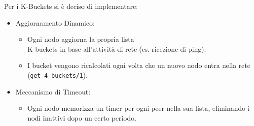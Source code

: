 \documentclass{article}
\begin{document}
Per i K-Buckets si è deciso di implementare:
\begin{itemize}
    \item Aggiornamento Dinamico:
    \begin{itemize}
        \item Ogni nodo aggiorna la propria lista\\ K-buckets in base all'attività di rete (es. ricezione di ping).
        \item I bucket vengono ricalcolati ogni volta che un nuovo nodo entra nella rete \\ (\texttt{get\_4\_buckets/1}).
    \end{itemize}
    \item Meccanismo di Timeout:
    \begin{itemize}
        \item Ogni nodo memorizza un timer per ogni peer nella sua lista, eliminando i nodi inattivi dopo un certo periodo.
    \end{itemize}
\end{itemize}
\end{document}
